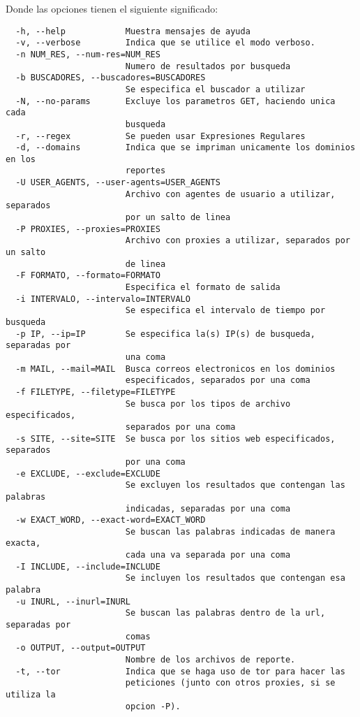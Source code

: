 \documentclass[12pt]{article}
\begin{document}
Donde las opciones tienen el siguiente significado:
\begin{verbatim}
  -h, --help            Muestra mensajes de ayuda
  -v, --verbose         Indica que se utilice el modo verboso.
  -n NUM_RES, --num-res=NUM_RES
                        Numero de resultados por busqueda
  -b BUSCADORES, --buscadores=BUSCADORES
                        Se especifica el buscador a utilizar
  -N, --no-params       Excluye los parametros GET, haciendo unica cada
                        busqueda
  -r, --regex           Se pueden usar Expresiones Regulares
  -d, --domains         Indica que se impriman unicamente los dominios en los
                        reportes
  -U USER_AGENTS, --user-agents=USER_AGENTS
                        Archivo con agentes de usuario a utilizar, separados
                        por un salto de linea
  -P PROXIES, --proxies=PROXIES
                        Archivo con proxies a utilizar, separados por un salto
                        de linea
  -F FORMATO, --formato=FORMATO
                        Especifica el formato de salida
  -i INTERVALO, --intervalo=INTERVALO
                        Se especifica el intervalo de tiempo por busqueda
  -p IP, --ip=IP        Se especifica la(s) IP(s) de busqueda, separadas por
                        una coma
  -m MAIL, --mail=MAIL  Busca correos electronicos en los dominios
                        especificados, separados por una coma
  -f FILETYPE, --filetype=FILETYPE
                        Se busca por los tipos de archivo especificados,
                        separados por una coma
  -s SITE, --site=SITE  Se busca por los sitios web especificados, separados
                        por una coma
  -e EXCLUDE, --exclude=EXCLUDE
                        Se excluyen los resultados que contengan las palabras
                        indicadas, separadas por una coma
  -w EXACT_WORD, --exact-word=EXACT_WORD
                        Se buscan las palabras indicadas de manera exacta,
                        cada una va separada por una coma
  -I INCLUDE, --include=INCLUDE
                        Se incluyen los resultados que contengan esa palabra
  -u INURL, --inurl=INURL
                        Se buscan las palabras dentro de la url, separadas por
                        comas
  -o OUTPUT, --output=OUTPUT
                        Nombre de los archivos de reporte.
  -t, --tor             Indica que se haga uso de tor para hacer las
                        peticiones (junto con otros proxies, si se utiliza la
                        opcion -P).
\end{verbatim}
\end{document}
